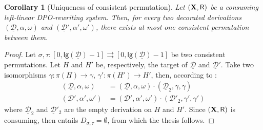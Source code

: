 \documentclass[a4paper]{article}
\def\R{\mathsf{R}}
\def\X{\textbf {\textup{X}}}
\newcommand{\dder}[1]{\mathscr{#1}}
\newcommand{\der}[1]{\underline{\dder{#1}}}
\newcommand{\lgh}[0]{\mathsf{lg}}
\newtheorem{corollary}[theorem]{Corollary}
\theoremstyle{definition}
\begin{document}
\begin{corollary}[Uniqueness of consistent permutation]\label{cor:unique}
Let $(\X,\R)$ be a consuming left-linear DPO-rewriting system. Then, for every two decorated derivations $(\der{D}, \alpha, \omega)$ and $(\der{D}', \alpha', \omega')$, there exists at most one consistent permutation between them.
\end{corollary}
\begin{proof}
Let $\sigma, \tau: [0, \lgh(\der{D})-1]\rightrightarrows [0, \lgh(\der{D})-1]$ be two consistent permutations. Let $H$  and $H'$ be, respectively, the target of $\der{D}$ and $\der{D}'$. Take two isomorphisms $\gamma:\pi(H)\to \gamma$, $\gamma':\pi(H')\to H'$, then, according to :
\begin{align*}(\der{D}, \alpha, \omega)&=(\der{D}, \alpha, \omega)\cdot (\der{D}_2, \gamma, \gamma) \\(\der{D}', \alpha', \omega')&=(\der{D}', \alpha', \omega')\cdot (\der{D}'_2, \gamma', \gamma') 
\end{align*} 
where $\der{D}_2$ and $\der{D}'_2$ are the empty derivation on $H$ and $H'$. Since $(\X, \R)$ is consuming, then  entails $D_{\sigma, \tau}=\emptyset$, from which the thesis follows.
\end{proof}
\end{document}
